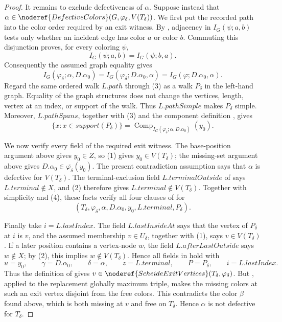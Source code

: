 \begin{proof}
It remains to exclude defectiveness of $\alpha$.  Suppose instead that
$\alpha\in\noderef{DefectiveColors}(G,\varphi_\delta,V(T_\delta))$.
We first put the recorded path into the color order required by an exit
witness.  By , adjacency in
$I_G(\psi;a,b)$ tests only whether an incident edge has color $a$ or
color $b$.  Commuting this disjunction proves, for every coloring $\psi$,
\[
                 I_G(\psi;a,b)=I_G(\psi;b,a).
\]
Consequently the assumed graph equality gives
\[
 I_G(\varphi_\delta;\alpha,D.\alpha_0)
 =I_G(\varphi_\delta;D.\alpha_0,\alpha)
 =I_G(\varphi;D.\alpha_0,\alpha).                            \tag{3}
\]
Regard the same ordered walk $L.path$ through (3) as a walk
$P_\delta$ in the left-hand graph.  Equality of the graph structures
does not change the vertices, length, vertex at an index, or support of
the walk.  Thus $L.pathSimple$ makes $P_\delta$ simple.  Moreover,
$L.pathSpans$, together with (3) and the component definition
, gives
\[
 \{x:x\in\mathit{support}(P_\delta)\}
 =\operatorname{Comp}_{I_G(\varphi_\delta;\alpha,D.\alpha_0)}(y_0).
                                                               \tag{4}
\]

We now verify every field of the required exit witness.  The base-position
argument above gives $y_0\in Z$, so (1) gives
$y_0\in V(T_\delta)$; the missing-set argument above gives
$D.\alpha_0\in\overline{\varphi_\delta}(y_0)$.  The present
contradiction assumption says that $\alpha$ is defective for
$V(T_\delta)$.  The terminal-exclusion field $L.terminalOutside$ of
 says $L.terminal\notin X$, and (2) therefore
gives $L.terminal\notin V(T_\delta)$.  Together with simplicity and (4),
these facts verify all four clauses of
 for
\[
 (T_\delta,\varphi_\delta,\alpha,D.\alpha_0,
   y_0,L.terminal,P_\delta).
\]

Finally take $i=L.lastIndex$.  The field $L.lastInsideAt$ says that the
vertex of $P_\delta$ at $i$ is $v$, and the assumed membership
$v\in U_\delta$, together with (1), says $v\in V(T_\delta)$.  If a later
position contains a vertex-node $w$,
the field $L.afterLastOutside$ says $w\notin X$; by (2), this implies
$w\notin V(T_\delta)$.  Hence all fields in
 hold with
\[
 u=y_0,\qquad \gamma=D.\alpha_0,\qquad \delta=\alpha,
 \qquad z=L.terminal,\qquad P=P_\delta,\qquad i=L.lastIndex.
\]
Thus the definition of  gives
$v\in\noderef{ScheideExitVertices}(T_\delta,\varphi_\delta)$.
But , applied to the replacement globally
maximum triple, makes the missing colors at such an exit vertex disjoint
from the free colors.  This contradicts the color $\beta$ found above,
which is both missing at $v$ and free on $T_\delta$.
Hence $\alpha$ is not defective for $T_\delta$.
\end{proof}
